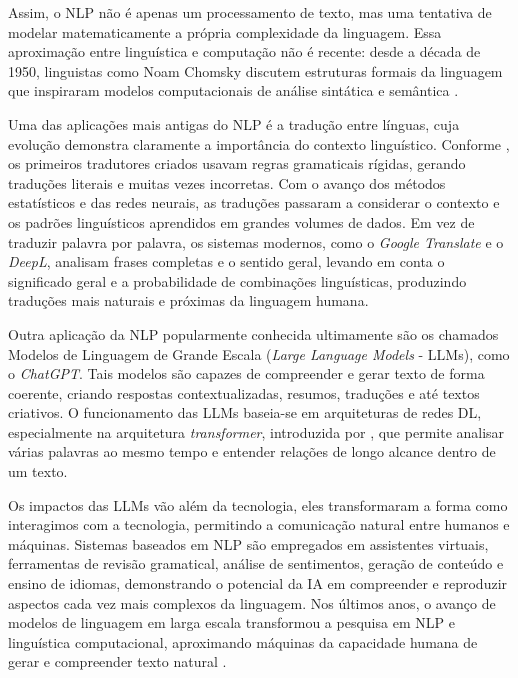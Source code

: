 Assim, o NLP não é apenas um processamento de texto, mas uma tentativa de modelar matematicamente a própria complexidade da linguagem. Essa aproximação entre linguística e computação não é recente: desde a década de 1950, linguistas como Noam Chomsky discutem estruturas formais da linguagem que inspiraram modelos computacionais de análise sintática e semântica \cite{chomsky1957syntactic}.

Uma das aplicações mais antigas do NLP é a tradução entre línguas, cuja evolução demonstra claramente a importância do contexto linguístico. Conforme \textcite{hutchins2005history}, os primeiros tradutores criados usavam regras gramaticais rígidas, gerando traduções literais e muitas vezes incorretas.
Com o avanço dos métodos estatísticos e das redes neurais, as traduções passaram a considerar o contexto e os padrões linguísticos aprendidos em grandes volumes de dados.
Em vez de traduzir palavra por palavra, os sistemas modernos, como o \textit{Google Translate} e o \textit{DeepL}, analisam frases completas e o sentido geral, levando em conta o significado geral e a probabilidade de combinações linguísticas, produzindo traduções mais naturais e próximas da linguagem humana.

Outra aplicação da NLP popularmente conhecida ultimamente são os chamados Modelos de Linguagem de Grande Escala (\textit{Large Language Models} - LLMs), como o \textit{ChatGPT}. Tais modelos são capazes de compreender e gerar texto de forma coerente, criando respostas contextualizadas, resumos, traduções e até textos criativos. O funcionamento das LLMs baseia-se em arquiteturas de redes DL, especialmente na arquitetura  \textit{transformer}, introduzida por \textcite{vaswani2017attention}, que permite analisar várias palavras ao mesmo tempo e entender relações de longo alcance dentro de um texto.

Os impactos das LLMs vão além da tecnologia, eles transformaram a forma como interagimos com a tecnologia, permitindo a comunicação natural entre humanos e máquinas. Sistemas baseados em NLP são empregados em assistentes virtuais, ferramentas de revisão gramatical, análise de sentimentos, geração de conteúdo e ensino de idiomas, demonstrando o potencial da IA em compreender e reproduzir aspectos cada vez mais complexos da linguagem. Nos últimos anos, o avanço de modelos de linguagem em larga escala transformou a pesquisa em NLP e linguística computacional, aproximando máquinas da capacidade humana de gerar e compreender texto natural \cite{bommasani2021opportunities}.


